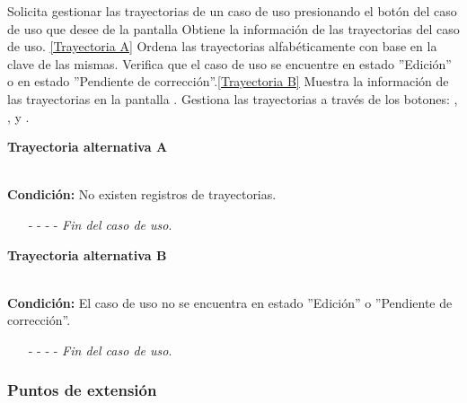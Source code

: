 \begin{UCtrayectoria}
	\UCpaso[\UCactor] Solicita gestionar las trayectorias de un caso de uso presionando el botón  del caso de uso que desee de la pantalla 
	\UCpaso[\UCsist] Obtiene la información de las trayectorias del caso de uso. \hyperlink{CU12-1-1:TAA}{[Trayectoria A]}
	\UCpaso[\UCsist] Ordena las trayectorias alfabéticamente con base en la clave de las mismas.
	\UCpaso[\UCsist] Verifica que el caso de uso se encuentre en estado ''Edición'' o en estado ''Pendiente de corrección''.\hyperlink{CU12-1-1:TAB}{[Trayectoria B]}
	\UCpaso[\UCsist] Muestra la información de las trayectorias en la pantalla . 
	\UCpaso[\UCactor] Gestiona las trayectorias a través de los botones: , \editar, y \eliminar. \label{CU12.1.1-P5}
\end{UCtrayectoria}		
\hypertarget{CU12-1-1:TAA}{\textbf{Trayectoria alternativa A}}\\
\noindent \textbf{Condición:} No existen registros de trayectorias.
\begin{enumerate}
	\UCpaso[\UCsist] Muestra el mensaje  en la pantalla  para indicar que no hay registros de trayectorias para mostrar. \label{CU12-1-1-TA1}
	\UCpaso[\UCactor] Gestiona las trayectorias a través del botón: . 
	\item[- -] - - {\em {Fin del caso de uso}}.%
\end{enumerate}
\hypertarget{CU12-1-1:TAB}{\textbf{Trayectoria alternativa B}}\\
\noindent \textbf{Condición:} El caso de uso no se encuentra en estado ''Edición'' o ''Pendiente de corrección''.
\begin{enumerate}
	\UCpaso[\UCsist]  Oculta el botón  del caso que no se encuentra en estado de ''Edición'' o ''Pendiente de corrección''.
	\item[- -] - - {\em {Fin del caso de uso}}.
\end{enumerate}

\subsubsection{Puntos de extensión}

